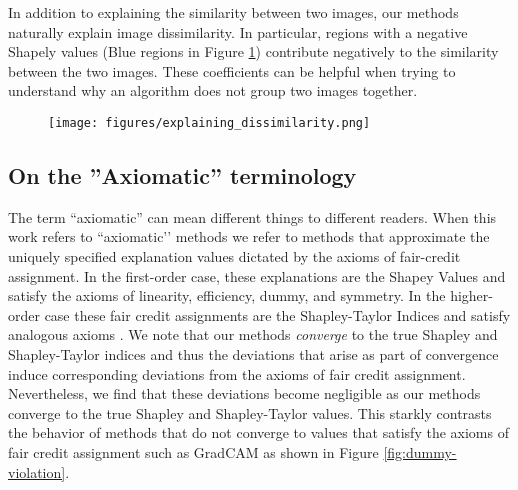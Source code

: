 \documentclass{article} %
\begin{document}
In addition to explaining the similarity between two images, our methods naturally explain image dissimilarity. In particular, regions with a negative Shapely values (Blue regions in Figure \ref{fig:explaining-dissimilarity}) contribute negatively to the similarity between the two images. These coefficients can be helpful when trying to understand why an algorithm does not group two images together. 

\begin{figure}[h]
\centering
\texttt{[image: figures/explaining\_dissimilarity.png]}
\label{fig:explaining-dissimilarity}
\end{figure}

\subsection{On the ''Axiomatic'' terminology}


The term ``axiomatic'' can mean different things to different readers. When this work refers to ``axiomatic’’ methods we refer to methods that approximate the uniquely specified explanation values dictated by the axioms of fair-credit assignment. In the first-order case, these explanations are the Shapey Values and satisfy the axioms of linearity, efficiency, dummy, and symmetry. In the higher-order case these fair credit assignments are the Shapley-Taylor Indices and satisfy analogous axioms \cite{sundararajan2020shapley}.  We note that our methods \textit{converge} to the true Shapley and Shapley-Taylor indices and thus the deviations that arise as part of convergence induce corresponding deviations from the axioms of fair credit assignment. Nevertheless, we find that these deviations become negligible as our methods converge to the true Shapley and Shapley-Taylor values. This starkly contrasts the behavior of methods that do not converge to values that satisfy the axioms of fair credit assignment such as GradCAM as shown in Figure \ref{fig:dummy-violation}.
\end{document}
